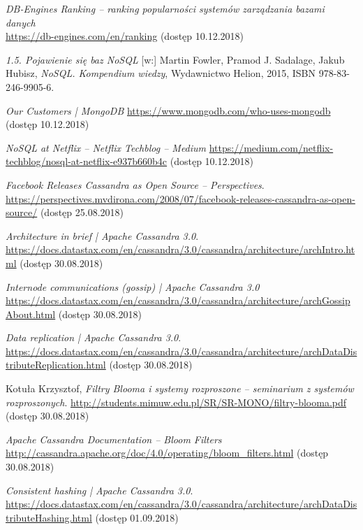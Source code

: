 \begin{thebibliography}{54}

\emph{DB-Engines Ranking -- ranking popularności systemów zarządzania bazami danych} \\
\url{https://db-engines.com/en/ranking} (dostęp 10.12.2018)

\emph{1.5. Pojawienie się baz NoSQL} [w:] Martin Fowler, Pramod J. Sadalage, Jakub Hubisz, \emph{NoSQL. Kompendium wiedzy}, Wydawnictwo Helion, 2015, ISBN 978-83-246-9905-6.

\emph{Our Customers | MongoDB} \url{https://www.mongodb.com/who-uses-mongodb} (dostęp 10.12.2018)

\emph{NoSQL at Netflix -- Netflix Techblog -- Medium} \url{https://medium.com/netflix-techblog/nosql-at-netflix-e937b660b4c} (dostęp 10.12.2018)

\emph{Facebook Releases Cassandra as Open Source -- Perspectives}.
\url{https://perspectives.mvdirona.com/2008/07/facebook-releases-cassandra-as-open-source/} (dostęp 25.08.2018)

\emph{Architecture in brief | Apache Cassandra 3.0}. 
\url{https://docs.datastax.com/en/cassandra/3.0/cassandra/architecture/archIntro.html} (dostęp 30.08.2018) 

\emph{Internode communications (gossip) | Apache Cassandra 3.0}
\url{https://docs.datastax.com/en/cassandra/3.0/cassandra/architecture/archGossipAbout.html}
(dostęp 30.08.2018)

\emph{Data replication | Apache Cassandra 3.0}. 
\url{https://docs.datastax.com/en/cassandra/3.0/cassandra/architecture/archDataDistributeReplication.html} (dostęp 30.08.2018)

Kotuła Krzysztof, \emph{Filtry Blooma i systemy rozproszone -- seminarium z systemów rozproszonych}. \url{http://students.mimuw.edu.pl/SR/SR-MONO/filtry-blooma.pdf} (dostęp 30.08.2018)

\emph{Apache Cassandra Documentation -- Bloom Filters}
\url{http://cassandra.apache.org/doc/4.0/operating/bloom_filters.html} (dostęp 30.08.2018)

\emph{Consistent hashing | Apache Cassandra 3.0}. 
\url{https://docs.datastax.com/en/cassandra/3.0/cassandra/architecture/archDataDistributeHashing.html} (dostęp 01.09.2018)


\end{thebibliography}
